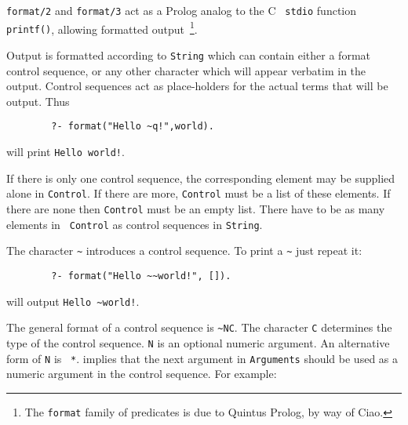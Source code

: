 \begin{description}

{\tt format/2} and {\tt format/3} act as a Prolog analog to the C {\tt
stdio} function {\tt printf()}, allowing formatted
output~\footnote{The {\tt format} family of predicates is due to
Quintus Prolog, by way of Ciao.}.

Output is formatted according to {\tt String} which can contain either
a format control sequence, or any other character which will appear
verbatim in the output. Control sequences act as place-holders for the
actual terms that will be output.  Thus
\begin{verbatim}
        ?- format("Hello ~q!",world).
\end{verbatim}

\noindent
will print {\tt Hello world!}.

If there is only one control sequence, the corresponding element may
be supplied alone in {\tt Control}.  If there are more, {\tt Control}
must be a list of these elements. If there are none then {\tt Control}
must be an empty list. There have to be as many elements in {\tt
Control} as control sequences in {\tt String}.

The character \verb|~| introduces a control sequence. To print 
        a \verb|~| just repeat it:  
        \begin{verbatim}
        ?- format("Hello ~~world!", []).
        \end{verbatim}
      \noindent
        will output  \verb|Hello ~world!|.


The general format of a control sequence is \verb|~NC|.  The character
{\tt C} determines the type of the control sequence.  {\tt N} is an
optional numeric argument.  An alternative form of {\tt N} is {\tt
*}. {\tt *} implies that the next argument in {\tt Arguments} should
be used as a numeric argument in the control sequence.  For example:


\end{description}
